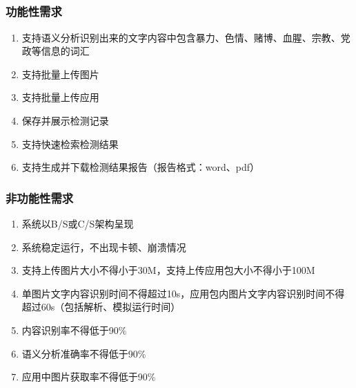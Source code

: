 \documentclass[UTF8]{ctexart}
\begin{document}
		\subsection{}
			\subsubsection{功能性需求}
				\begin{enumerate}
					\item 支持语义分析识别出来的文字内容中包含暴力、色情、赌博、血腥、宗教、党政等信息的词汇
					\item 支持批量上传图片
					\item 支持批量上传应用
					\item 保存并展示检测记录
					\item 支持快速检索检测结果
					\item 支持生成并下载检测结果报告（报告格式：word、pdf）
				\end{enumerate}
			\subsubsection{非功能性需求}
				\begin{enumerate}
					\item 系统以B/S或C/S架构呈现
					\item 系统稳定运行，不出现卡顿、崩溃情况
					\item 支持上传图片大小不得小于30M，支持上传应用包大小不得小于100M
					\item 单图片文字内容识别时间不得超过10s，应用包内图片文字内容识别时间不得超过60s（包括解析、模拟运行时间）
					\item 内容识别率不得低于90\%
					\item 语义分析准确率不得低于90\%
					\item 应用中图片获取率不得低于90\%
				\end{enumerate}
\end{document}
